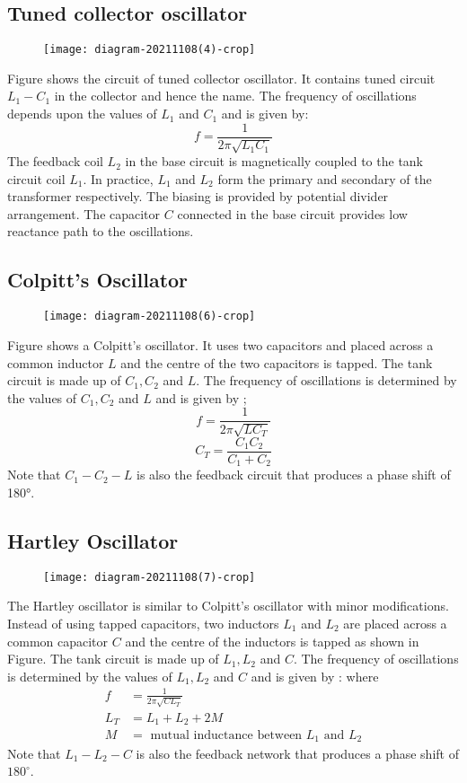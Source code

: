  \subsection{Tuned collector oscillator}
\begin{figure}[H]
	\centering
	\texttt{[image:  diagram-20211108(4)-crop]}
	\caption{}
	\label{}
\end{figure}
 Figure shows the circuit of tuned collector oscillator. It contains tuned circuit $L_{1}-C_{1}$ in the collector and hence the name. The frequency of oscillations depends upon the values of $L_{1}$ and $C_{1}$ and is given by:
 $$
 f=\frac{1}{2 \pi \sqrt{L_{1} C_{1}}}
 $$
 The feedback coil $L_{2}$ in the base circuit is magnetically coupled to the tank circuit coil $L_{1}$. In practice, $L_{1}$ and $L_{2}$ form the primary and secondary of the transformer respectively. The biasing is provided by potential divider arrangement. The capacitor $C$ connected in the base circuit provides low reactance path to the oscillations.
 \subsection{Colpitt’s Oscillator}
 \begin{figure}[H]
 	\centering
 	\texttt{[image: diagram-20211108(6)-crop]}
 	\caption{}
 	\label{}
 \end{figure}
 Figure shows a Colpitt's oscillator. It uses two capacitors and placed across a common inductor $L$ and the centre of the two capacitors is tapped. The tank circuit is made up of $C_{1}, C_{2}$ and $L$. The frequency of oscillations is determined by the values of $C_{1}, C_{2}$ and $L$ and is given by ;
 $$
 f=\frac{1}{2 \pi \sqrt{L C_{T}}}
 $$
 $$C_{T}=\frac{C_{1} C_{2}}{C_{1}+C_{2}}$$
 Note that $C_1-C_2-L$ is also the feedback circuit that produces a phase shift of 180°.
 \subsection{Hartley Oscillator}
 \begin{figure}[H]
 	\centering
 	\texttt{[image: diagram-20211108(7)-crop]}
 	\caption{}
 	\label{}
 \end{figure}
 The Hartley oscillator is similar to Colpitt's oscillator with minor modifications. Instead of using tapped capacitors, two inductors $L_{1}$ and $L_{2}$ are placed across a common capacitor $C$ and the centre of the inductors is tapped as shown in Figure. The tank circuit is made up of $L_{1}, L_{2}$ and $C$. The frequency of oscillations is determined by the values of $L_{1}, L_{2}$ and $C$ and is given by :
 where
 $$
 \begin{aligned}
 f &=\frac{1}{2 \pi \sqrt{C L_{T}}} \\
 L_{T} &=L_{1}+L_{2}+2 M \\
 M &=\text { mutual inductance between } L_{1} \text { and } L_{2}
 \end{aligned}
 $$
 Note that $L_{1}-L_{2}-C$ is also the feedback network that produces a phase shift of $180^{\circ}$.
